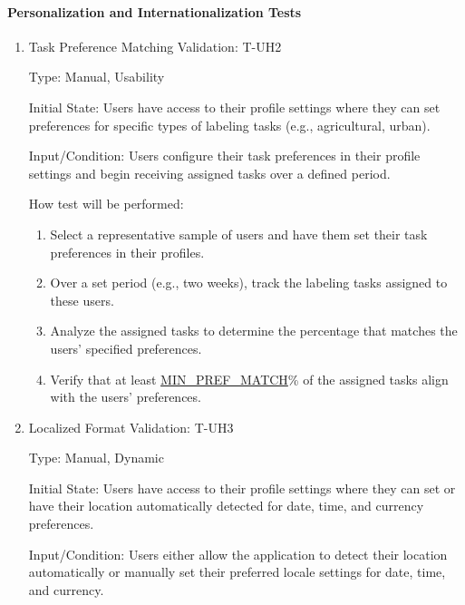 \documentclass[12pt, titlepage]{article}
\begin{document}
\paragraph{Personalization and Internationalization Tests}
\begin{enumerate}

\item{Task Preference Matching Validation: T-UH2\\}

Type: Manual, Usability

Initial State: Users have access to their profile settings where they can set preferences for specific types of labeling tasks (e.g., agricultural, urban).

Input/Condition: Users configure their task preferences in their profile settings and begin receiving assigned tasks over a defined period.

How test will be performed: 
\begin{enumerate}
    \item Select a representative sample of users and have them set their task preferences in their profiles.
    \item Over a set period (e.g., two weeks), track the labeling tasks assigned to these users.
    \item Analyze the assigned tasks to determine the percentage that matches the users' specified preferences.
    \item Verify that at least \hyperref[MIN_PREF_MATCH]{MIN\_PREF\_MATCH}\% of the assigned tasks align with the users' preferences.
\end{enumerate}

\item{Localized Format Validation: T-UH3\\}

Type: Manual, Dynamic

Initial State: Users have access to their profile settings where they can set or have their location automatically detected for date, time, and currency preferences.

Input/Condition: Users either allow the application to detect their location automatically or manually set their preferred locale settings for date, time, and currency.


\end{enumerate}
\end{document}
